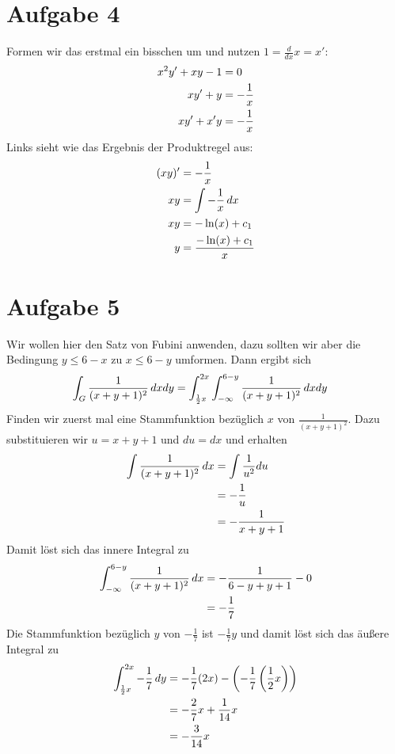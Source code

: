 \documentclass{article}
\begin{document}
	\section*{Aufgabe 4}
	Formen wir das erstmal ein bisschen um und nutzen $1 = \frac{d}{dx} x = x'$:
	\begin{align}
		x^2y' + xy - 1 &= 0 \notag \\
		xy' + y &= -\frac{1}{x} \notag \\
		xy' + x'y &= -\frac{1}{x} \notag
	\end{align}
	Links sieht wie das Ergebnis der Produktregel aus:
	\begin{align}
		(xy)' &= -\frac{1}{x} \notag \\
		xy &= \int -\frac{1}{x} \,dx \notag \\
		xy &= -\ln(x) + c_1 \notag \\
		y &= \frac{-\ln(x) + c_1}{x} \notag
	\end{align}
	
	\section*{Aufgabe 5}
	Wir wollen hier den Satz von Fubini anwenden, dazu sollten wir aber die Bedingung $y\le 6-x$ zu $x\le 6-y$ umformen. Dann ergibt sich
	\begin{align}
		\int_G \frac{1}{(x+y+1)^2} \,dxdy &= \int_{\frac{1}{2}x}^{2x}\int_{-\infty}^{6-y} \frac{1}{(x+y+1)^2} \,dxdy \notag
	\end{align}
	Finden wir zuerst mal eine Stammfunktion bezüglich $x$ von $\frac{1}{(x+y+1)^2}$. Dazu substituieren wir $u=x+y+1$ und $du=dx$ und erhalten
	\begin{align}
		\int \frac{1}{(x+y+1)^2} \,dx &= \int \frac{1}{u^2} du \notag \\
		&= -\frac{1}{u} \notag \\
		&= -\frac{1}{x+y+1} \notag
	\end{align}
	Damit löst sich das innere Integral zu
	\begin{align}
		\int_{-\infty}^{6-y} \frac{1}{(x+y+1)^2} \,dx &= -\frac{1}{6-y+y+1} - 0 \notag \\
		&= -\frac{1}{7} \notag
	\end{align}
	Die Stammfunktion bezüglich $y$ von $-\frac{1}{7}$ ist $-\frac{1}{7}y$ und damit löst sich das äußere Integral zu
	\begin{align}
		\int_{\frac{1}{2}x}^{2x} -\frac{1}{7}\, dy &= -\frac{1}{7}(2x) - \left(-\frac{1}{7}\left(\frac{1}{2}x\right)\right) \notag \\
		&= -\frac{2}{7}x + \frac{1}{14}x \notag \\
		&= -\frac{3}{14}x \notag
	\end{align}
\end{document}
